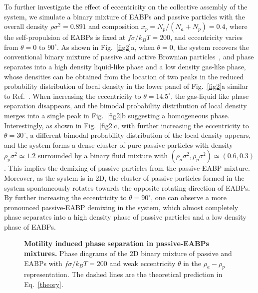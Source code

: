 \documentclass[prl, twocolumn, showpacs, preprintnumbers,amsmath,amssymb]{revtex4-1}
\begin{document}
To further investigate the effect of eccentricity on the collective assembly of the system, we simulate a binary mixture of EABPs and passive particles with the overall density $\rho \sigma^2 = 0.891$ and composition $x_p = N_p/(N_a + N_p) = 0.4$, where the self-propulsion of EABPs is fixed at $f\sigma/k_BT =200$, and eccentricity varies from $\theta = 0$ to $90^{\circ}$. As shown in Fig.~\ref{fig2}a, when $\theta = 0$, the system recovers the conventional binary mixture of passive and active Brownian particles~\cite{stenhammar2015a}, and phase separates into a high density liquid-like phase and a low density gas-like phase, whose densities can be obtained from the location of two peaks in the reduced probability distribution of local density in the lower panel of Fig.~\ref{fig2}a similar to Ref.~\cite{wysocki2016traveling,stenhammar2015a}. 
When increasing the eccentricity to $\theta = 14.5^{\circ}$, the gas-liquid like phase separation disappears, and the bimodal probability distribution of local density merges into a single peak in Fig.~\ref{fig2}b suggesting a homogeneous phase. Interestingly, as shown in Fig.~\ref{fig2}c, with further increasing the eccentricity to $\theta = 30^{\circ}$, a different bimodal probability distribution of the local density appears, and the system forms a dense cluster of pure passive particles with density $\rho_p \sigma ^2 \simeq 1.2$  surrounded by a binary fluid mixture with $(\rho_a \sigma^2, \rho_p \sigma^2) \simeq (0.6,0.3)$. This implies the demixing of passive particles from the passive-EABP mixture. Moreover, as the system is in 2D, the cluster of passive particles formed in the system spontaneously rotates towards the opposite rotating direction of EABPs. By further increasing the eccentricity to $\theta = 90^{\circ}$, one can observe a more pronounced passive-EABP demixing in the system, which almost completely phase separates into a high density phase of passive particles and a low density phase of EABPs.

\begin{figure}
\centering
\caption{\label{fig3}{\bf Motility induced phase separation in passive-EABPs mixtures.} Phase diagrams of the 2D binary mixture of passive and EABPs with $f\sigma/k_B T = 200$ and weak eccentricity $\theta$ in the $\rho_a-\rho_p$ representation. The dashed lines are the theoretical prediction in Eq.~\ref{theory}.}
\end{figure}
\end{document}
